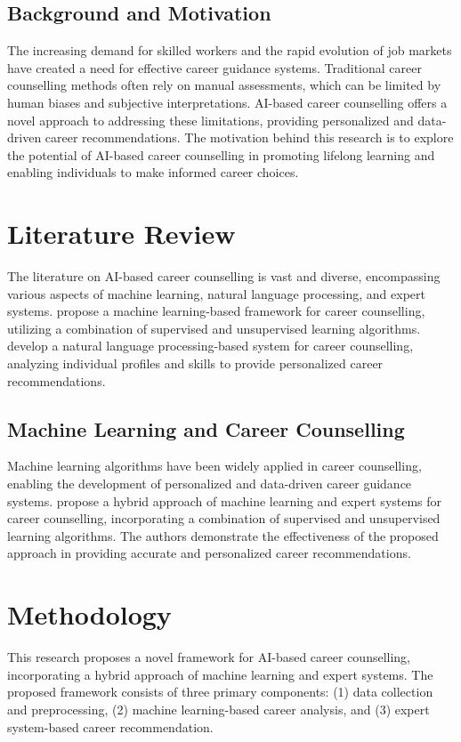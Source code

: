 \documentclass[12pt,a4paper]{article}
\begin{document}
\subsection{Background and Motivation}
The increasing demand for skilled workers and the rapid evolution of job markets have created a need for effective career guidance systems. Traditional career counselling methods often rely on manual assessments, which can be limited by human biases and subjective interpretations. AI-based career counselling offers a novel approach to addressing these limitations, providing personalized and data-driven career recommendations. The motivation behind this research is to explore the potential of AI-based career counselling in promoting lifelong learning and enabling individuals to make informed career choices.

\section{Literature Review}
The literature on AI-based career counselling is vast and diverse, encompassing various aspects of machine learning, natural language processing, and expert systems. \citet{patel2019} propose a machine learning-based framework for career counselling, utilizing a combination of supervised and unsupervised learning algorithms. \citet{jain2020} develop a natural language processing-based system for career counselling, analyzing individual profiles and skills to provide personalized career recommendations.

\subsection{Machine Learning and Career Counselling}
Machine learning algorithms have been widely applied in career counselling, enabling the development of personalized and data-driven career guidance systems. \citet{kumar2018} propose a hybrid approach of machine learning and expert systems for career counselling, incorporating a combination of supervised and unsupervised learning algorithms. The authors demonstrate the effectiveness of the proposed approach in providing accurate and personalized career recommendations.

\section{Methodology}
This research proposes a novel framework for AI-based career counselling, incorporating a hybrid approach of machine learning and expert systems. The proposed framework consists of three primary components: (1) data collection and preprocessing, (2) machine learning-based career analysis, and (3) expert system-based career recommendation.
\end{document}
